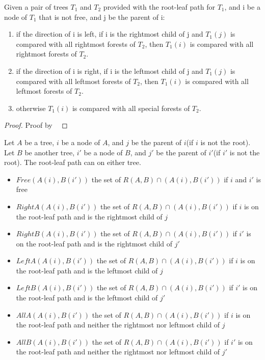 \begin{lemma}
Given a pair of trees $T_1$ and $T_2$ provided with the root-leaf path for $T_1$, and i be a node of $T_1$ that is not free, and j be the parent of i:
\begin{enumerate}
\item if the direction of i is left, if i is the rightmost child of j and $T_1(j)$ is compared with all rightmost forests of $T_2$, then $T_1(i)$ is compared with all rightmost forests of $T_2$.
\item if the direction of i is right, if i is the leftmost child of j and $T_1(j)$ is compared with all leftmost forests of $T_2$, then $T_1(i)$ is compared with all leftmost forests of $T_2$.
\item otherwise $T_1(i)$ is compared with all special forests of $T_2$.
\end{enumerate}
\end{lemma}
\begin{proof}
Proof by ~\cite{dulucq2005decomposition}
\end{proof}
\begin{notation}
Let $A$ be a tree, $i$ be a node of $A$, and $j$ be the parent of $i$(if $i$ is not the root). Let $B$ be another tree, $i'$ be a node of $B$, and $j'$ be the parent of $i'$(if $i'$ is not the root). The root-leaf path can on either tree.
\begin{itemize}
\item $Free(A(i), B(i'))$ the set of $R(A, B) \cap (A(i), B(i'))$ if $i$ and $i'$ is free
\item $RightA(A(i), B(i'))$ the set of $R(A, B) \cap (A(i), B(i'))$ if $i$ is on the root-leaf path and is the rightmost child of $j$
\item $RightB(A(i), B(i'))$ the set of $R(A, B) \cap (A(i), B(i'))$ if $i'$ is on the root-leaf path and is the rightmost child of $j'$
\item $LeftA(A(i), B(i'))$ the set of $R(A, B) \cap (A(i), B(i'))$ if $i$ is on the root-leaf path and is the leftmost child of $j$
\item $LeftB(A(i), B(i'))$ the set of $R(A, B) \cap (A(i), B(i'))$ if $i'$ is on the root-leaf path and is the leftmost child of $j'$
\item $AllA(A(i), B(i'))$ the set of $R(A, B) \cap (A(i), B(i'))$ if $i$ is on the root-leaf path and neither the rightmost nor leftmost child of $j$
\item $AllB(A(i), B(i'))$ the set of $R(A, B) \cap (A(i), B(i'))$ if $i'$ is on the root-leaf path and neither the rightmost nor leftmost child of $j'$ 
\end{itemize}
\end{notation}
